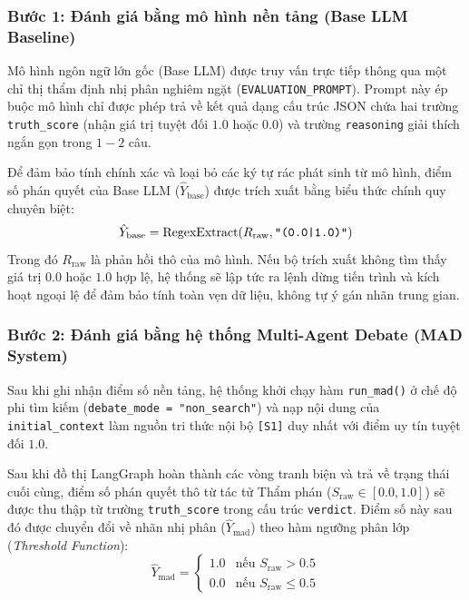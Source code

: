 \documentclass[12pt,a4paper]{report}
\begin{document}
\subsubsection{Bước 1: Đánh giá bằng mô hình nền tảng (Base LLM Baseline)}
Mô hình ngôn ngữ lớn gốc (Base LLM) được truy vấn trực tiếp thông qua một chỉ thị thẩm định nhị phân nghiêm ngặt (\texttt{EVALUATION\_PROMPT}). Prompt này ép buộc mô hình chỉ được phép trả về kết quả dạng cấu trúc JSON chứa hai trường \texttt{truth\_score} (nhận giá trị tuyệt đối $1.0$ hoặc $0.0$) và trường \texttt{reasoning} giải thích ngắn gọn trong $1 - 2$ câu.

Để đảm bảo tính chính xác và loại bỏ các ký tự rác phát sinh từ mô hình, điểm số phán quyết của Base LLM ($\hat{Y}_{\text{base}}$) được trích xuất bằng biểu thức chính quy chuyên biệt:
\begin{equation}
    \hat{Y}_{\text{base}} = \text{RegexExtract}(R_{\text{raw}}, \text{\texttt{"(0.0|1.0)"}})
\end{equation}
Trong đó $R_{\text{raw}}$ là phản hồi thô của mô hình. Nếu bộ trích xuất không tìm thấy giá trị $0.0$ hoặc $1.0$ hợp lệ, hệ thống sẽ lập tức ra lệnh dừng tiến trình và kích hoạt ngoại lệ để đảm bảo tính toàn vẹn dữ liệu, không tự ý gán nhãn trung gian.

\subsubsection{Bước 2: Đánh giá bằng hệ thống Multi-Agent Debate (MAD System)}
Sau khi ghi nhận điểm số nền tảng, hệ thống khởi chạy hàm \texttt{run\_mad()} ở chế độ phi tìm kiếm (\texttt{debate\_mode = "non\_search"}) và nạp nội dung của \texttt{initial\_context} làm nguồn tri thức nội bộ \texttt{[S1]} duy nhất với điểm uy tín tuyệt đối $1.0$.

Sau khi đồ thị LangGraph hoàn thành các vòng tranh biện và trả về trạng thái cuối cùng, điểm số phán quyết thô từ tác tử Thẩm phán ($S_{\text{raw}} \in [0.0, 1.0]$) sẽ được thu thập từ trường \texttt{truth\_score} trong cấu trúc \texttt{verdict}. Điểm số này sau đó được chuyển đổi về nhãn nhị phân ($\hat{Y}_{\text{mad}}$) theo hàm ngưỡng phân lớp (\textit{Threshold Function}):
\begin{equation}
    \hat{Y}_{\text{mad}} = \begin{cases} 
        1.0 & \text{nếu } S_{\text{raw}} > 0.5 \\
        0.0 & \text{nếu } S_{\text{raw}} \le 0.5 
    \end{cases}
\end{equation}
\end{document}

